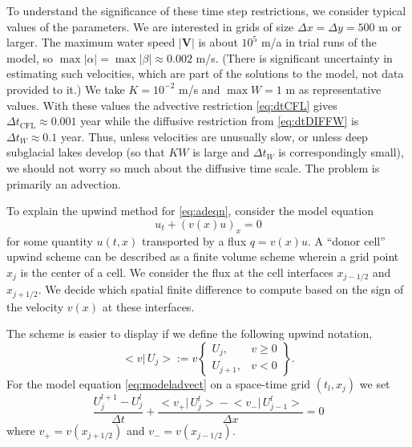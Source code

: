 \documentclass[11pt,final]{amsart}%
\newcommand\bV{\mathbf{V}}
\begin{document}
To understand the significance of these time step restrictions, we consider typical values of the parameters.  We are interested in grids of size $\Delta x = \Delta y = 500$ m or larger.  The maximum water speed $|\bV|$ is about $10^5$ m/a in trial runs of the model, so $\max |\alpha| = \max |\beta| \approx 0.002$ m/s.  (There is significant uncertainty in estimating such velocities, which are part of the solutions to the model, not data provided to it.)  We take $K=10^{-2}$ m/s and $\max W=1$ m as representative values.  With these values the advective restriction \eqref{eq:dtCFL} gives $\Delta t_{\text{CFL}} \approx 0.001$ year while the diffusive restriction from \eqref{eq:dtDIFFW} is $\Delta t_W \approx 0.1$ year.  Thus, unless velocities are unusually slow, or unless deep subglacial lakes develop (so that $KW$ is large and $\Delta t_W$ is correspondingly small), we should not worry so much about the diffusive time scale.  The problem is primarily an advection.

To explain the upwind method for \eqref{eq:adeqn}, consider the model equation
\begin{equation} \label{eq:modeladvect}
u_t + (v(x) u)_x = 0
\end{equation}
for some quantity $u(t,x)$ transported by a flux $q = v(x) u$.  A ``donor cell'' upwind scheme can be described as a finite volume scheme \citep{LeVeque} wherein a grid point $x_j$ is the center of a cell.  We consider the flux at the cell interfaces $x_{j-1/2}$ and $x_{j+1/2}$.  We decide which spatial finite difference to compute based on the sign of the velocity $v(x)$ at these interfaces.

The scheme is easier to display if we define the following upwind notation,
\newcommand{\up}[2]{\big<#1\big|\,#2\big>}
	$$\up{v}{U_j} := v \begin{Bmatrix} U_j, & v \ge 0 \\ U_{j+1}, & v < 0 \end{Bmatrix}.$$
For the model equation \eqref{eq:modeladvect} on a space-time grid $(t_l,x_j)$ we set
\begin{equation}\label{eq:modelfdadvect}
\frac{U_j^{l+1} - U_j^l}{\Delta t} + \frac{\up{v_+}{U_j^l} - \up{v_-}{U_{j-1}^l}}{\Delta x} = 0
\end{equation}
where $v_+ = v(x_{j+1/2})$ and $v_-=v(x_{j-1/2})$.
\end{document}
